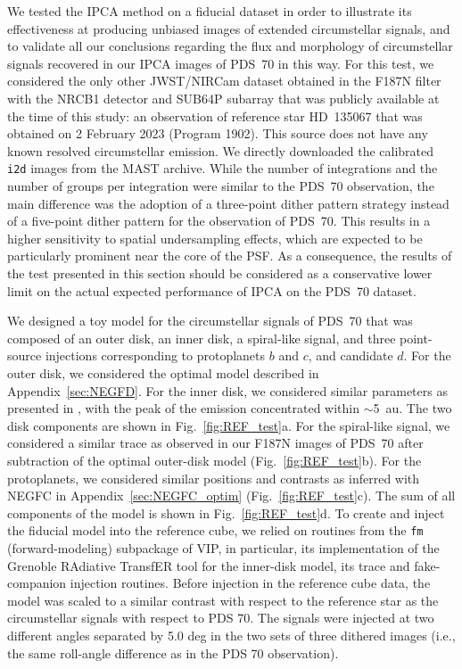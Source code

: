 \documentclass[longauth]{aa}
\newcommand{\vc}[1]{#1}
\newcommand{\new}[1]{#1}
\begin{document}
\begin{appendix}
\new{We tested the IPCA method on a fiducial dataset in order to illustrate its effectiveness at producing unbiased images of extended circumstellar signals, and to validate all our conclusions regarding the flux and morphology of circumstellar signals recovered in our IPCA images of PDS~70 in this way. For this test, we considered the only other JWST/NIRCam dataset obtained in the F187N filter with the NRCB1 detector and SUB64P subarray that was publicly available at the time of this study: an observation of reference star HD~135067 that was obtained on 2 February 2023 (Program 1902). This source does not have any known resolved circumstellar emission. We directly downloaded the calibrated \texttt{i2d} images from the MAST archive. While the number of integrations and the number of groups per integration were similar to the PDS~70 observation, the main difference was the adoption of a three-point dither pattern strategy instead of a five-point dither pattern for the observation of PDS~70. This results in a higher sensitivity to spatial undersampling effects, which are expected to be particularly prominent near the core of the PSF. As a consequence, the results of the test presented in this section should be considered as a conservative lower limit on the actual expected performance of IPCA on the PDS~70 dataset.}

\new{We designed a toy model for the circumstellar signals of PDS~70 that was composed of an outer disk, an inner disk, a spiral-like signal, and three point-source injections corresponding to protoplanets $b$ and $c$, and candidate $d$. For the outer disk, we considered the optimal model described in Appendix~\ref{sec:NEGFD}. For the inner disk, we considered similar parameters as presented in \citet{Keppler2018}, with the peak of the emission concentrated within $\sim$5~au. The two disk components are shown in Fig.~\ref{fig:REF_test}a. For the spiral-like signal, we considered a similar trace as observed in our F187N images of PDS~70 after subtraction of the optimal outer-disk model (Fig.~\ref{fig:REF_test}b). For the protoplanets, we considered similar positions and contrasts as inferred with NEGFC in Appendix~\ref{sec:NEGFC_optim} (Fig.~\ref{fig:REF_test}c). The sum of all components of the model is shown in Fig.~\ref{fig:REF_test}d. To create and inject the fiducial model into the reference cube, we relied on routines from the \texttt{fm} (forward-modeling) subpackage of VIP, in particular, its implementation of the Grenoble RAdiative TransfER tool \citep{Augereau1999, Milli2019} for the inner-disk model, its trace and fake-companion injection routines. Before injection in the reference cube data, the model was scaled to a similar contrast \vc{with respect to} the reference star as the circumstellar signals with respect to PDS 70. The signals were injected at two different angles separated by 5.0 deg in the two sets of three dithered images (i.e., the same roll-angle difference as in the PDS 70 observation).}


\end{appendix}
\end{document}
